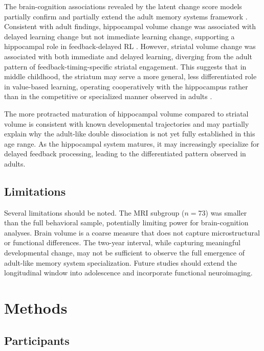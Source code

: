 \documentclass[11pt]{article}
\begin{document}
The brain-cognition associations revealed by the latent change score models partially confirm and partially extend the adult memory systems framework \citep{foerde2006, poldrack2001}. Consistent with adult findings, hippocampal volume change was associated with delayed learning change but not immediate learning change, supporting a hippocampal role in feedback-delayed RL \citep{shohamy2009}. However, striatal volume change was associated with both immediate and delayed learning, diverging from the adult pattern of feedback-timing-specific striatal engagement. This suggests that in middle childhood, the striatum may serve a more general, less differentiated role in value-based learning, operating cooperatively with the hippocampus rather than in the competitive or specialized manner observed in adults \citep{poldrack2001}.

The more protracted maturation of hippocampal volume compared to striatal volume is consistent with known developmental trajectories \citep{goddings2014, tamnes2010} and may partially explain why the adult-like double dissociation is not yet fully established in this age range. As the hippocampal system matures, it may increasingly specialize for delayed feedback processing, leading to the differentiated pattern observed in adults.

\subsection{Limitations}

Several limitations should be noted. The MRI subgroup ($n = 73$) was smaller than the full behavioral sample, potentially limiting power for brain-cognition analyses. Brain volume is a coarse measure that does not capture microstructural or functional differences. The two-year interval, while capturing meaningful developmental change, may not be sufficient to observe the full emergence of adult-like memory system specialization. Future studies should extend the longitudinal window into adolescence and incorporate functional neuroimaging.

\section{Methods}

\subsection{Participants}
\end{document}
